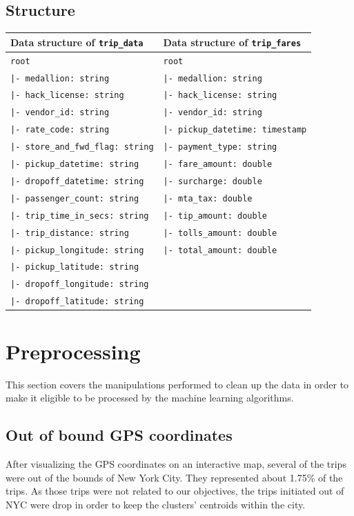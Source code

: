 \documentclass[a4paper]{article}
\begin{document}
\subsection{Structure}
\begin{tabularx}{\textwidth}{XX}
  \toprule
  Data structure of \texttt{trip\_data} & Data structure of \texttt{trip\_fares}\\
  \midrule
    \verb/root/ & \verb/root/\\
    \verb/|- medallion: string/ & \verb/|- medallion: string/\\
    \verb/|- hack_license: string/ & \verb/|- hack_license: string/\\
    \verb/|- vendor_id: string/ & \verb/|- vendor_id: string/\\
    \verb/|- rate_code: string/ & \verb/|- pickup_datetime: timestamp/\\
    \verb/|- store_and_fwd_flag: string/ & \verb/|- payment_type: string/\\
    \verb/|- pickup_datetime: string/ & \verb/|- fare_amount: double/\\
    \verb/|- dropoff_datetime: string/ & \verb/|- surcharge: double/\\
    \verb/|- passenger_count: string/ & \verb/|- mta_tax: double/\\
    \verb/|- trip_time_in_secs: string/ & \verb/|- tip_amount: double/\\
    \verb/|- trip_distance: string/ & \verb/|- tolls_amount: double/\\
    \verb/|- pickup_longitude: string/ & \verb/|- total_amount: double/\\
    \verb/|- pickup_latitude: string/ &\\
    \verb/|- dropoff_longitude: string/ &\\
    \verb/|- dropoff_latitude: string/ &\\
  \bottomrule
\end{tabularx}


\section{Preprocessing}
This section covers the manipulations performed to clean up the data in order to make it eligible to be processed by the machine learning algorithms.

\subsection{Out of bound GPS coordinates}
After visualizing the GPS coordinates on an interactive map, several of the trips were out of the bounds of New York City. They represented about 1.75\% of the trips. As those trips were not related to our objectives, the trips initiated out of NYC were drop in order to keep the clusters' centroids within the city.
\end{document}
